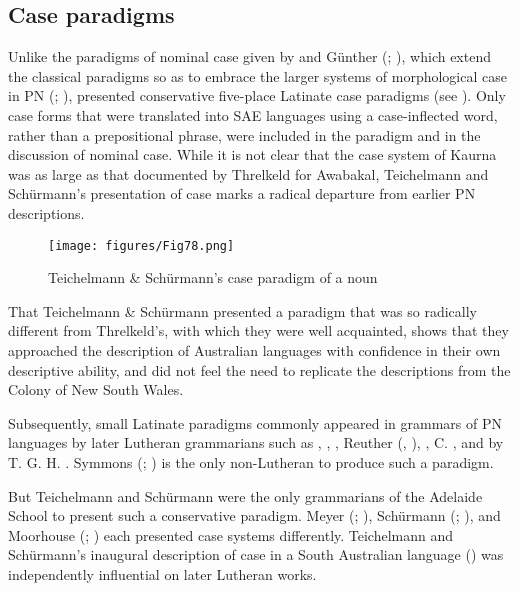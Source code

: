 \subsection{Case paradigms}
\label{sec:key:5.3.1}

Unlike the paradigms of nominal case given by \citet{threlkeld_australian_1834} and Günther (\citeyear{gunther_native_1838}; \citeyear{gunther_lecture_1840}), which extend the classical paradigms so as to embrace the larger systems of morphological case in PN (; ), \citet{teichelmann_outlines_1840} presented conservative five-place Latinate case paradigms (see ). Only case forms that were translated into SAE languages using a case-inflected word, rather than a prepositional phrase, were included in the paradigm and in the discussion of nominal case. While it is not clear that the case system of Kaurna was as large as that documented by Threlkeld for Awabakal, Teichelmann and Schürmann’s presentation of case marks a radical departure from earlier PN descriptions.
 
\begin{figure}
\texttt{[image: figures/Fig78.png]}
\caption{\label{fig:5:78}Teichelmann \& Schürmann’s case paradigm of a noun \citeyearpar[5]{teichelmann_outlines_1840}}
\end{figure}


That Teichelmann \& Schürmann presented a paradigm that was so radically different from Threlkeld’s, with which they were well acquainted, shows that they approached the description of Australian languages with confidence in their own descriptive ability, and did not feel the need to replicate the descriptions from the Colony of New South Wales. 

Subsequently, small Latinate paradigms commonly appeared in grammars of PN languages by later Lutheran grammarians such as \citet{koch_untitled_1868}, \citet{schoknecht_grammar_1947}, \citet{flierl_dieri_1880}, Reuther (\citeyear{reuther_dieri_1894}, \citeyear{reuther_ms_1899}), \citet{kempe_grammar_1891}, C. \citet{strehlow_untitled_1931}, and by T. G. H. \citet{strehlow_aranda_1944}. Symmons (\citeyear{symmons_grammatical_1841}; ) is the only non-Lutheran to produce such a paradigm.

But Teichelmann and Schürmann were the only grammarians of the Adelaide School to present such a conservative paradigm. Meyer (\citeyear{meyer_vocabulary_1843}; ), Schürmann (\citealt{schurmann_letter_1844};  ), and Moorhouse (\citealt{moorhouse_vocabulary_1846}; ) each presented case systems differently. Teichelmann and Schürmann’s inaugural description of case in a South Australian language (\citeyear{teichelmann_outlines_1840}) was independently influential on later Lutheran works.

